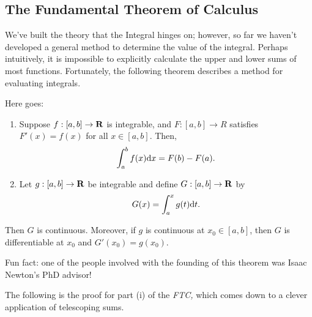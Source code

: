 \documentclass{article}
\begin{document}
  \subsection{The Fundamental Theorem of Calculus}

  We've built the theory that the Integral hinges on; however, so far we haven't developed a general method to determine the value of the integral. Perhaps intuitively, it is impossible to explicitly calculate the upper and lower sums of most functions. Fortunately, the following theorem describes a method for evaluating integrals.
  \begin{thm}
    Here goes:
    \item[]
    \begin{enumerate}
      \item Suppose \(f:[a,b] \to \mathbf{R}\) is integrable, and \(F:[a,b] \to R\) satisfies \(F'(x) = f(x)\) for all \(x \in [a,b]\). Then, \[
        \int_{a}^{b}f(x) \mathrm{d} x = F(b) - F(a). 
      \]
      \item Let \(g:[a,b] \to \mathbf{R}\) be integrable and define \(G:[a,b] \to \mathbf{R}\) by \[
        G(x) = \int_{a}^{x}g(t) \mathrm{d} t.
      \]
    \end{enumerate}

    Then \(G\) is continuous. Moreover, if \(g\) is continuous at \(x_0 \in [a,b]\), then \(G\) is differentiable at \(x_0\) and \(G'(x_0) = g(x_0)\).
  \end{thm}

  \begin{remark}
    Fun fact: one of the people involved with the founding of this theorem was Isaac Newton's PhD advisor!
  \end{remark}

  The following is the proof for part (i) of the \emph{FTC,} which comes down to a clever application of telescoping sums.
\end{document}
